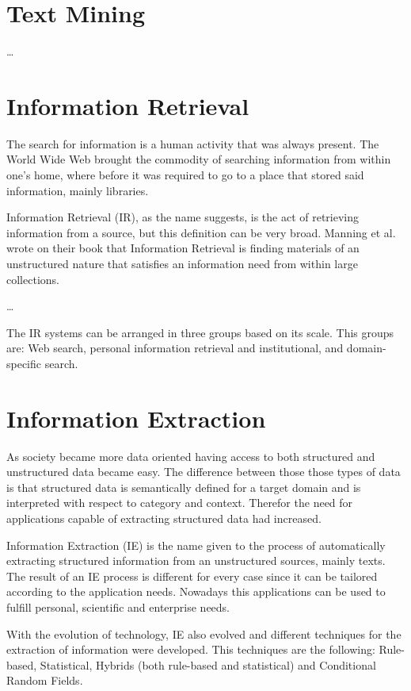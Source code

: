 \section{Text Mining}

\dots

\section{Information Retrieval}

The search for information is a human activity that was always present.
The World Wide Web brought the commodity of searching information from within one's home, where before it was required to go to a place that stored said information, mainly libraries.

Information Retrieval (IR), as the name suggests, is the act of retrieving information from a source, but this definition can be very broad.
Manning et al.\cite{manning2008introduction} wrote on their book that Information Retrieval is finding materials of an unstructured nature that satisfies an information need from within large collections.

\dots %

The IR systems can be arranged in three groups based on its scale.
This groups are: Web search, personal information retrieval and institutional, and domain-specific search.

\section{Information Extraction}

As society became more data oriented having access to both structured and unstructured data became easy.
The difference between those those types of data is that structured data is semantically defined for a target domain and is interpreted with respect to category and context.
Therefor the need for applications capable of extracting structured data had increased.

Information Extraction (IE) is the name given to the process of automatically extracting structured information from an unstructured sources, mainly texts.
The result of an IE process is different for every case since it can be tailored according to the application needs.
Nowadays this applications can be used to fulfill personal, scientific and enterprise needs.

With the evolution of technology, IE also evolved and different techniques for the extraction of information were developed.
This techniques are the following: Rule-based, Statistical, Hybrids (both rule-based and statistical) and Conditional Random Fields\cite{sarawagi2008information}.

